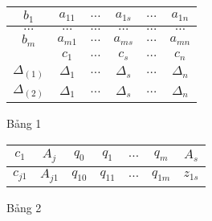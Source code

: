 \documentclass{article}
\begin{document}
\begin{enumerate}
                            \begin{figure}
                                \caption{Bảng 1}
                                    \begin{center}
                                        \begin{tabular}{|c|c|c|c|c|c|}
                                            \hline
                                            $b_1$ & $a_{11}$ & $\ldots$ & $a_{1s}$ & $\ldots$ & $a_{1n}$ \\
                                            \hline
                                            $\ldots$ & $\ldots$ & $\ldots$ & $\ldots$ & $\ldots$ & $\ldots$ \\
                                            \hline
                                            $b_m$ & $a_{m1}$ & $\ldots$ & $a_{ms}$ & $\ldots$ & $a_{mn}$ \\
                                            \hline
                                            & $c_1$ & $\ldots$ & $c_s$ & $\ldots$ & $c_n$ \\
                                            \hline
                                            $\Delta_{(1)}$ & $\Delta_1$ & $\ldots$ & $\Delta_s$ & $\ldots$ & $\Delta_n$ \\
                                            \hline
                                            $\Delta_{(2)}$ & $\Delta_1$ & $\ldots$ & $\Delta_s$ & $\ldots$ & $\Delta_n$ \\
                                            \hline    
                                        \end{tabular}
                                    \end{center}  
                            \end{figure} 
                            \begin{figure}
                                \caption{Bảng 2}
                                    \begin{center}
                                        \begin{tabular}{|c|c|c|c|c|c|c|}
                                            \hline
                                            $c_1$ & $A_j$ & $q_0$ & $q_1$ & $\ldots$ & $q_m$ & $A_s$ \\
                                            \hline
                                            $c_{j1}$ & $A_{j1}$ & $q_{10}$ & $q_{11}$ & $\ldots$ & $q_{1m}$ & $z_{1s}$ \\

\end{tabular}
\end{center}
\end{figure}
\end{enumerate}
\end{document}
